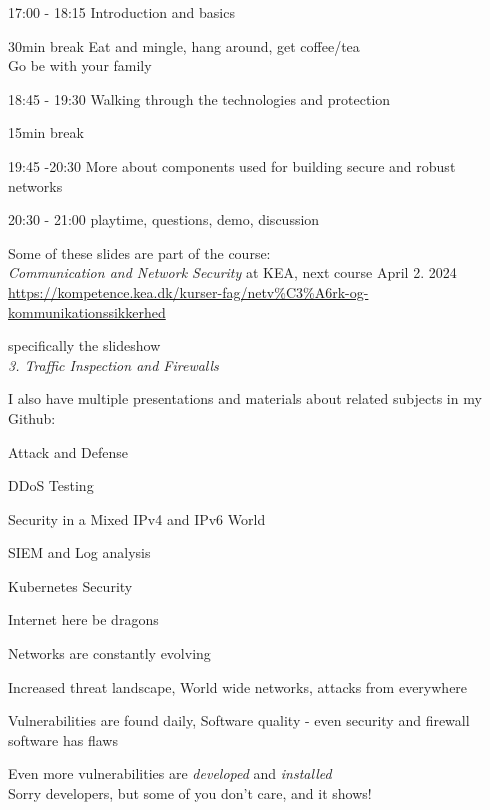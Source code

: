 \documentclass[Screen16to9,17pt]{foils}
\begin{document}
\begin{list2}
\item 17:00 - 18:15  Introduction and basics\\

\item 30min break  Eat and mingle, hang around, get coffee/tea\\
Go be with your family

\item 18:45 - 19:30 Walking through the technologies and protection\\

\item 15min break\\

\item 19:45 -20:30 More about components used for building secure and robust networks\\

\item 20:30 - 21:00 playtime, questions, demo, discussion
\end{list2}



Some of these slides are part of the course:\\
\emph{Communication and Network Security} at KEA, next course April 2. 2024\\
\url{https://kompetence.kea.dk/kurser-fag/netv%C3%A6rk-og-kommunikationssikkerhed}

specifically the slideshow\\
\emph{3. Traffic Inspection and Firewalls}

I also have multiple presentations and materials about related subjects in my Github:

\begin{list2}
\item Attack and Defense
\item DDoS Testing
\item Security in a Mixed IPv4 and IPv6 World
\item SIEM and Log analysis
\item Kubernetes Security
\end{list2}


\centerline{\Large Internet here be dragons}

\begin{list2}
\item Networks are constantly evolving
\item Increased threat landscape, World wide networks, attacks from everywhere
\item Vulnerabilities are found daily, Software quality - even security and firewall software has flaws
\item Even more vulnerabilities are \emph{developed} and \emph{installed}\\
Sorry developers, but some of you don't care, and it shows!
\end{list2}
\end{document}
